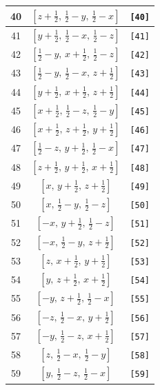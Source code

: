 \documentclass[fleqn,8pt]{jsarticle}
\begin{document}
\begin{longtable}{ccc}
40 & $\left[ z + \frac{1}{2},\, \frac{1}{2} - y,\, \frac{1}{2} - x \right]$ & {\tt [40]} \\ \hline
41 & $\left[ y + \frac{1}{2},\, \frac{1}{2} - x,\, \frac{1}{2} - z \right]$ & {\tt [41]} \\ \hline
42 & $\left[ \frac{1}{2} - y,\, x + \frac{1}{2},\, \frac{1}{2} - z \right]$ & {\tt [42]} \\ \hline
43 & $\left[ \frac{1}{2} - y,\, \frac{1}{2} - x,\, z + \frac{1}{2} \right]$ & {\tt [43]} \\ \hline
44 & $\left[ y + \frac{1}{2},\, x + \frac{1}{2},\, z + \frac{1}{2} \right]$ & {\tt [44]} \\ \hline
45 & $\left[ x + \frac{1}{2},\, \frac{1}{2} - z,\, \frac{1}{2} - y \right]$ & {\tt [45]} \\ \hline
46 & $\left[ x + \frac{1}{2},\, z + \frac{1}{2},\, y + \frac{1}{2} \right]$ & {\tt [46]} \\ \hline
47 & $\left[ \frac{1}{2} - z,\, y + \frac{1}{2},\, \frac{1}{2} - x \right]$ & {\tt [47]} \\ \hline
48 & $\left[ z + \frac{1}{2},\, y + \frac{1}{2},\, x + \frac{1}{2} \right]$ & {\tt [48]} \\ \hline
49 & $\left[ x,\, y + \frac{1}{2},\, z + \frac{1}{2} \right]$ & {\tt [49]} \\ \hline
50 & $\left[ x,\, \frac{1}{2} - y,\, \frac{1}{2} - z \right]$ & {\tt [50]} \\ \hline
51 & $\left[ - x,\, y + \frac{1}{2},\, \frac{1}{2} - z \right]$ & {\tt [51]} \\ \hline
52 & $\left[ - x,\, \frac{1}{2} - y,\, z + \frac{1}{2} \right]$ & {\tt [52]} \\ \hline
53 & $\left[ z,\, x + \frac{1}{2},\, y + \frac{1}{2} \right]$ & {\tt [53]} \\ \hline
54 & $\left[ y,\, z + \frac{1}{2},\, x + \frac{1}{2} \right]$ & {\tt [54]} \\ \hline
55 & $\left[ - y,\, z + \frac{1}{2},\, \frac{1}{2} - x \right]$ & {\tt [55]} \\ \hline
56 & $\left[ - z,\, \frac{1}{2} - x,\, y + \frac{1}{2} \right]$ & {\tt [56]} \\ \hline
57 & $\left[ - y,\, \frac{1}{2} - z,\, x + \frac{1}{2} \right]$ & {\tt [57]} \\ \hline
58 & $\left[ z,\, \frac{1}{2} - x,\, \frac{1}{2} - y \right]$ & {\tt [58]} \\ \hline
59 & $\left[ y,\, \frac{1}{2} - z,\, \frac{1}{2} - x \right]$ & {\tt [59]} \\ \hline

\end{longtable}
\end{document}
